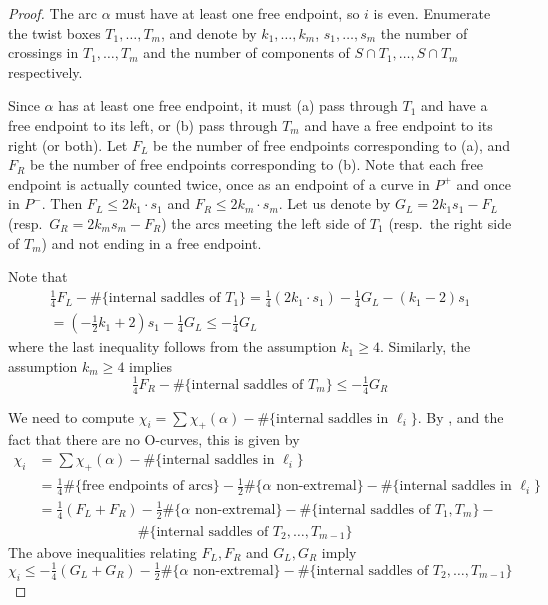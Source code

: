 \documentclass[10pt,a4paper]{amsart}
\begin{document}
\begin{proof}
The arc $\alpha$ must have at least one free endpoint, so $i$ is even. 
Enumerate the twist boxes $T_1,\dots,T_m$, and denote by $k_1,\dots,k_m$, $s_1,\dots,s_m$ 
the number of crossings in $T_1,\dots,T_m$ and the number of components of 
$S\cap T_1,\dots,S\cap T_m$ respectively.

Since $\alpha$ has at least one free endpoint, it must (a) pass through $T_1$ and have a 
free endpoint to its left, or (b) pass through $T_m$ and have a free endpoint to its 
right (or both). Let $F_L$ be the number of free endpoints corresponding to (a), and 
$F_R$ be the number of free endpoints corresponding to (b). Note that each free endpoint 
is actually counted twice, once as an endpoint of a curve in $P^+$ and once in $P^-$. 
Then $F_L \le 2k_1 \cdot s_1$ and $F_R \le 2k_m\cdot s_m$. Let us denote by 
$G_L = 2k_1s_1 - F_L$ (resp.\ $G_R = 2k_m s_m - F_R$) the arcs meeting the left 
side of $T_1$ (resp.\ the right side of $T_m$) and not ending in a free endpoint. 
    
Note that 
\begin{multline}
\tfrac14 F_L  - \#\{\text{internal saddles of }T_1\} = \tfrac14 (2k_1 \cdot s_1) - 
\tfrac14 G_L  - (k_1-2)s_1 
\\
= (-\tfrac12 k_1 +2)s_1 - \tfrac14 G_L \le - \tfrac14 G_L     
\end{multline}
where the last inequality follows from the assumption $k_1\ge 4$.
Similarly, the assumption $k_m\ge 4$ implies
\[
\tfrac14 F_R  - \#\{\text{internal saddles of }T_m\} \le - \tfrac14 G_R
\]

We need to compute $\chi_i = \sum \chi_+(\alpha) - \#\{\text{internal saddles in }\ell_i\}$. 
By ,  and the fact that 
there are no O-curves, this is given by
\begin{align*}
\chi_i &= \sum \chi_+(\alpha) - \#\{\text{internal saddles in }\ell_i\} \\
&= \tfrac14 \#\{\text{free endpoints of arcs}\} - \tfrac12 \#\{\alpha\text{ non-extremal}\} - \#
\{\text{internal saddles in }\ell_i\} \\
&= \tfrac14 (F_L + F_R) -\tfrac12\#\{\alpha\text{ non-extremal}\} - \#\{\text{internal 
saddles of }T_1,T_m\} - \\
& \hspace{3cm}  \#\{\text{internal saddles of }T_2,\dots, T_{m-1}\}
\end{align*}
The above inequalities relating $F_L, F_R$ and $G_L, G_R$ imply
\begin{equation}\label{Eqn:ChiBound}
\chi_i \leq -\tfrac14 (G_L + G_R) - \tfrac12\#\{\alpha\text{ non-extremal}\} 
- \#\{\text{internal saddles of }T_2,\dots, T_{m-1}\}
\end{equation}


\end{proof}
\end{document}
